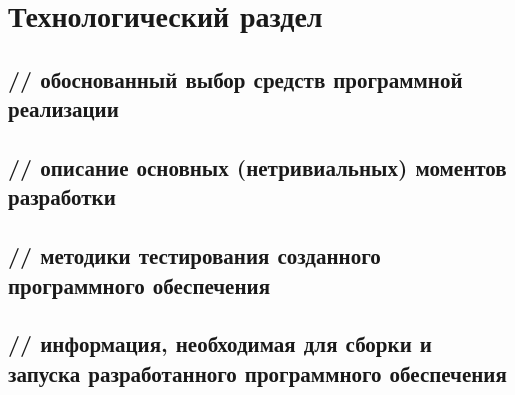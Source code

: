\chapter{Технологический раздел}

%
\section{// обоснованный выбор средств программной реализации}

%
\section{// описание основных (нетривиальных) моментов разработки}

%
\section{// методики тестирования созданного программного обеспечения}

%
\section{// информация, необходимая для сборки и запуска разработанного программного обеспечения}